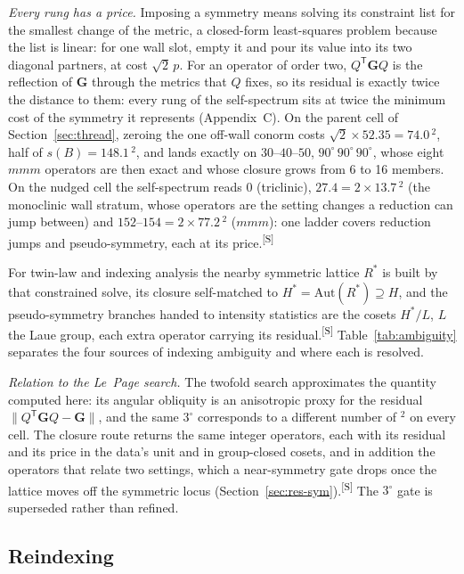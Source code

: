 \documentclass[preprint,pdf]{iucr}          %
\makeatletter
\newcommand{\Ang}{\text{\AA}}
\newcommand{\Gmet}{\mathbf{G}}
\newcommand{\chk}[1]{\textsuperscript{[S\@nameuse{zn@#1}]}}
\makeatother
\begin{document}
\emph{Every rung has a price.} Imposing a symmetry means solving its constraint list for the smallest change of the metric, a closed-form least-squares problem because the list is linear: for one wall slot, empty it and pour its value into its two diagonal partners, at cost $\sqrt2\,p$. For an operator of order two, $Q^{\mathsf T}\Gmet Q$ is the reflection of $\Gmet$ through the metrics that $Q$ fixes, so its residual is exactly twice the distance to them: every rung of the self-spectrum sits at twice the minimum cost of the symmetry it represents (Appendix~C). On the parent cell of Section~\ref{sec:thread}, zeroing the one off-wall conorm costs $\sqrt2\times52.35=74.0$\,\Ang$^2$, half of $s(B)=148.1$\,\Ang$^2$, and lands exactly on $30$--$40$--$50$, $90^\circ\,90^\circ\,90^\circ$, whose eight $mmm$ operators are then exact and whose closure grows from 6 to 16 members. On the nudged cell the self-spectrum reads 0 (triclinic), $27.4=2\times13.7$\,\Ang$^2$ (the monoclinic wall stratum, whose operators are the setting changes a reduction can jump between) and $152$--$154=2\times77.2$\,\Ang$^2$ ($mmm$): one ladder covers reduction jumps and pseudo-symmetry, each at its price.\chk{z:sym-profile}

For twin-law and indexing analysis the nearby symmetric lattice $R^*$ is built by that constrained solve, its closure self-matched to $H^*=\mathrm{Aut}(R^*)\supseteq H$, and the pseudo-symmetry branches handed to intensity statistics are the cosets $H^*/L$, $L$ the Laue group, each extra operator carrying its residual.\chk{z:pseudo} Table~\ref{tab:ambiguity} separates the four sources of indexing ambiguity and where each is resolved.

\emph{Relation to the Le~Page search.} The twofold search approximates the quantity computed here: its angular obliquity is an anisotropic proxy for the residual $\|Q^{\mathsf T}\Gmet Q-\Gmet\|$, and the same $3^\circ$ corresponds to a different number of \Ang$^2$ on every cell. The closure route returns the same integer operators, each with its residual and its price in the data's unit and in group-closed cosets, and in addition the operators that relate two settings, which a near-symmetry gate drops once the lattice moves off the symmetric locus (Section~\ref{sec:res-sym}).\chk{z:lepage} The $3^\circ$ gate is superseded rather than refined.

\subsection{Reindexing}
\label{sec:reindex-proc}
\label{sec:exact}
\end{document}
